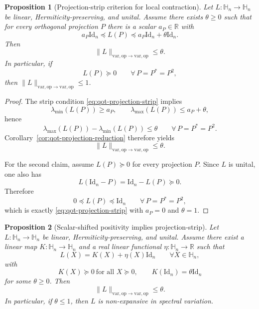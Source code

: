 \documentclass[11pt]{article}
\newcommand{\RR}{\mathbb{R}}
\newcommand{\Id}{\mathrm{Id}}
\newcommand{\Hh}{\mathbb{H}}
\newcommand{\op}{\mathrm{op}}
\newcommand{\varop}{\mathrm{var},\op}
\theoremstyle{plain}
\newtheorem{proposition}{Proposition}[section]
\begin{document}
\begin{proposition}[Projection-strip criterion for local contraction]
\label{prop:qot-projection-strip}
Let $L:\Hh_n\to\Hh_n$ be linear, Hermiticity-preserving, and unital.
Assume there exists $\theta\ge 0$ such that for every orthogonal projection $P$ there is a scalar $a_P\in\RR$ with
\begin{equation}
\label{eq:qot-projection-strip}
a_P\Id_n \preceq L(P)\preceq a_P\Id_n+\theta \Id_n.
\end{equation}
Then
\[
\|L\|_{\varop\to\varop}\le \theta.
\]
In particular, if
\[
L(P)\succeq 0
\qquad \forall\, P=P^\ast=P^2,
\]
then $\|L\|_{\varop\to\varop}\le 1$.
\end{proposition}

\begin{proof}
The strip condition \eqref{eq:qot-projection-strip} implies
\[
\lambda_{\min}(L(P))\ge a_P,
\qquad
\lambda_{\max}(L(P))\le a_P+\theta,
\]
hence
\[
\lambda_{\max}(L(P))-\lambda_{\min}(L(P))\le \theta
\qquad \forall\, P=P^\ast=P^2.
\]
Corollary~\ref{cor:qot-projection-reduction} therefore yields
\[
\|L\|_{\varop\to\varop}\le \theta.
\]

For the second claim, assume $L(P)\succeq 0$ for every projection $P$.
Since $L$ is unital, one also has
\[
L(\Id_n-P)=\Id_n-L(P)\succeq 0.
\]
Therefore
\[
0\preceq L(P)\preceq \Id_n
\qquad \forall\, P=P^\ast=P^2,
\]
which is exactly \eqref{eq:qot-projection-strip} with $a_P=0$ and $\theta=1$.
\end{proof}

\begin{proposition}[Scalar-shifted positivity implies projection-strip]
\label{prop:qot-shifted-positive}
Let $L:\Hh_n\to\Hh_n$ be linear, Hermiticity-preserving, and unital.
Assume there exist a linear map $K:\Hh_n\to\Hh_n$ and a real linear functional $\eta:\Hh_n\to\RR$ such that
\begin{equation}
\label{eq:qot-shifted-positive-decomp}
L(X)=K(X)+\eta(X)\Id_n
\qquad \forall X\in \Hh_n,
\end{equation}
with
\begin{equation}
\label{eq:qot-shifted-positive-assumptions}
K(X)\succeq 0 \ \text{for all } X\succeq 0,
\qquad
K(\Id_n)=\theta \Id_n
\end{equation}
for some $\theta\ge 0$.
Then
\[
\|L\|_{\varop\to\varop}\le \theta.
\]
In particular, if $\theta\le 1$, then $L$ is non-expansive in spectral variation.
\end{proposition}
\end{document}
